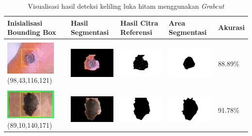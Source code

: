 \begin{table}[H]
	\centering
	\caption{Visualisasi hasil deteksi keliling luka hitam menggunakan \emph{Grabcut}}
	\label{tabel_hasil_2}
	\begin{tabular}{|m{1.0in}|m{1.0in}|m{1.0in}|m{1.0in}|m{0.6in}|}
		\hline
		\textbf{Inisialisasi Bounding Box} & \textbf{Hasil Segmentasi} & \textbf{Hasil Citra Referensi} & \textbf{Area Segmentasi} & \textbf{Akurasi} \\
		\hline
		
		&  &  & \\
		\includegraphics[width=1.0in]{gambar/hasil_segmentasi/luka_hitam/image_14_rect.jpg} {\centering\fontsize{10}{10}\selectfont(98,43,116,121)}&
		\includegraphics[width=1.0in]{gambar/hasil_segmentasi/luka_hitam/result_14.jpg}&
		\includegraphics[width=1.0in]{gambar/hasil_segmentasi/luka_hitam/mask_r_14.jpg}&
		\includegraphics[width=1.0in]{gambar/hasil_segmentasi/luka_hitam/14_r.jpg}&
		88.89\% \\
		\hline
		
		&  &  & \\
		\includegraphics[width=1.0in]{gambar/hasil_segmentasi/luka_hitam/image_15_rect.jpg} {\centering\fontsize{10}{10}\selectfont(89,10,140,171)}&
		\includegraphics[width=1.0in]{gambar/hasil_segmentasi/luka_hitam/result_15.jpg}&
		\includegraphics[width=1.0in]{gambar/hasil_segmentasi/luka_hitam/mask_r_15.jpg}&
		\includegraphics[width=1.0in]{gambar/hasil_segmentasi/luka_hitam/15_r.jpg}&
		91.78\% \\
		\hline


\end{tabular}
\end{table}
